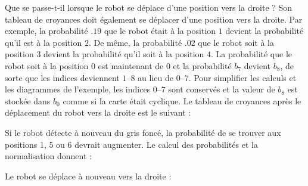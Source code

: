 Que se passe-t-il lorsque le robot se déplace d'une position vers la droite ? Son tableau de croyances doit également se déplacer d'une position vers la droite. Par exemple, la probabilité $.19$ que le robot était à la position $1$ devient la probabilité qu'il est à la position $2$. De même, la probabilité $.02$ que le robot soit à la position $3$ devient la probabilité qu'il soit à la position $4$. La probabilité que le robot soit à la position $0$ est maintenant de $0$ et la probabilité $b_7$ devient $b_8$, de sorte que les indices deviennent $1$--$8$ au lieu de $0$--$7$. Pour simplifier les calculs et les diagrammes de l'exemple, les indices $0$--$7$ sont conservés et la valeur de $b_8$ est stockée dans $b_0$ comme si la carte était cyclique. Le tableau de croyances après le déplacement du robot vers la droite est le suivant :
\begin{center}
\end{center}
Si le robot détecte à nouveau du gris foncé, la probabilité de se trouver aux positions 1, 5 ou 6 devrait augmenter. Le calcul des probabilités et la normalisation donnent :
\begin{center}
\end{center}
Le robot se déplace à nouveau vers la droite :
\begin{center}
\end{center}
